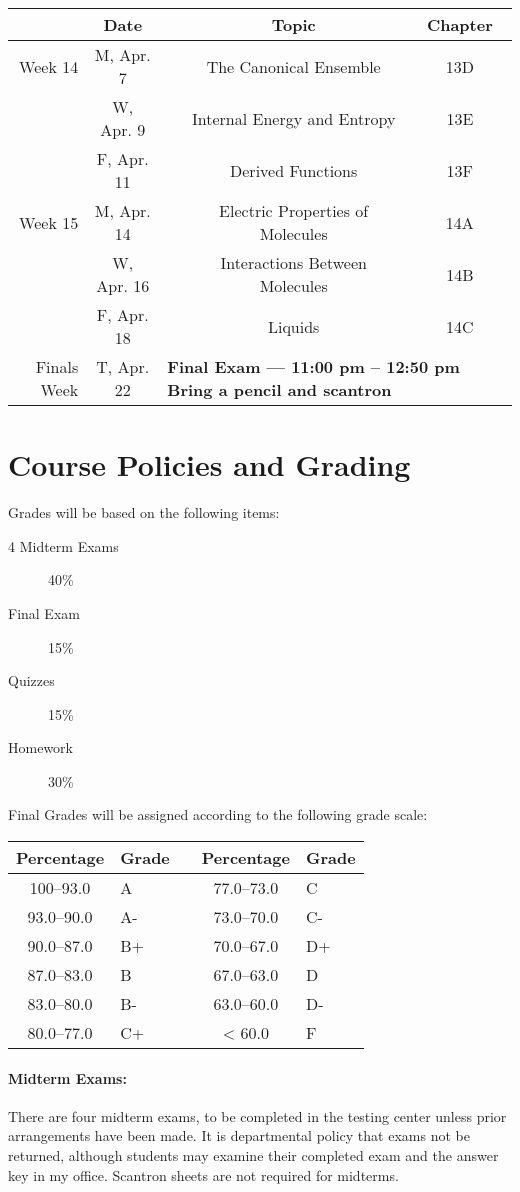 \documentclass[12pt, letterpaper]{article}
\begin{document}
\begin{tabular}{rcccc}
& Date && Topic & Chapter\\
\midrule
Week 14 & M, Apr. 7&& The Canonical Ensemble & 13D\\
& W, Apr. 9&& Internal Energy and Entropy & 13E\\
& F, Apr. 11&& Derived Functions & 13F\\
\midrule
Week 15 & M, Apr. 14&& Electric Properties of Molecules & 14A\\
& W, Apr. 16&& Interactions Between Molecules & 14B\\
& F, Apr. 18&& Liquids & 14C\\
\midrule
Finals Week& T, Apr. 22& \multicolumn{3}{l}{\textbf{Final Exam --- 11:00 pm -- 12:50 pm Bring a pencil and scantron}}\\
\end{tabular}

\section*{Course Policies and Grading}
Grades will be based on the following items:
\begin{description}
	\item[4 Midterm Exams] 40\%
	\item[Final Exam] 15\%
	\item[Quizzes] 15\%
	\item[Homework] 30\%
\end{description}
Final Grades will be assigned according to the following grade scale:

\begin{tabular}{cl|c|cl}
	Percentage & Grade &  & Percentage & Grade \\ \midrule
	100--93.0  & A     &  & 77.0--73.0 & C     \\
	93.0--90.0 & A-    &  & 73.0--70.0 & C-    \\
	90.0--87.0 & B+    &  & 70.0--67.0 & D+    \\
	87.0--83.0 & B     &  & 67.0--63.0 & D     \\
	83.0--80.0 & B-    &  & 63.0--60.0 & D-    \\
	80.0--77.0 & C+    &  & < 60.0     & F
\end{tabular}
\paragraph{Midterm Exams:}
There are four midterm exams, to be completed in the testing center unless prior arrangements have been made. It is departmental policy that exams not be returned, although students may examine their completed exam and the answer key in my office. Scantron sheets are not required for midterms.
\end{document}
